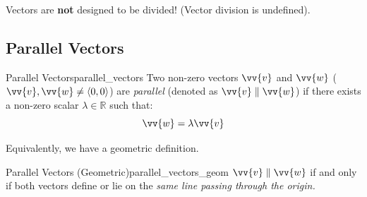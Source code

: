 \begin{tcolorbox}[colback=red!5!white, colframe=red!75!black, title=Important Note]
Vectors are \textbf{not} designed to be divided! (Vector division is undefined).
\end{tcolorbox}



\subsection{Parallel Vectors}

\begin{definition}{Parallel Vectors}{parallel_vectors}
Two non-zero vectors $\vv{v}$ and $\vv{w}$ ($\vv{v}, \vv{w} \neq \ang{0,0}$) are \textit{parallel} (denoted as $\vv{v} \parallel \vv{w}$) if there exists a non-zero scalar $\lambda \in \mathbb{R}$ such that:
\[
\vv{w} = \lambda \vv{v}
\]
\end{definition}

Equivalently, we have a geometric definition.
\begin{definition}{Parallel Vectors (Geometric)}{parallel_vectors_geom}
$\vv{v} \parallel \vv{w}$ if and only if both vectors define or lie on the \textit{same line passing through the origin.}
\end{definition}
